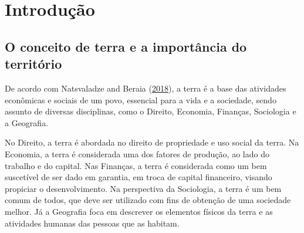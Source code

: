 \documentclass[
	12pt,				%
	oneside,			%
	a4paper,			%
	chapter=TITLE,		%
	section=TITLE,		%
	english,			%
	brazil				%
	]{abntex2}
\begin{document}
{%
	\hypersetup{hidelinks}
	\listoffigures*
	\cleardoublepage
	
	\listofquadros*
	\cleardoublepage
	
	\listoftables*
	\cleardoublepage
	
	\imprimirlistadesiglas
	
	\imprimirlistadesimbolos
	
	\tableofcontents*
	\cleardoublepage
	
}%


\textual

\hypertarget{intro}{%
\chapter{Introdução}\label{intro}}

\hypertarget{o-conceito-de-terra-e-a-importuxe2ncia-do-territuxf3rio}{%
\section{O conceito de terra e a importância do território}\label{o-conceito-de-terra-e-a-importuxe2ncia-do-territuxf3rio}}

De acordo com Natsvaladze and Beraia (\protect\hyperlink{ref-realestate}{2018}), a terra é a base das atividades econômicas e sociais
de um povo, essencial para a vida e a sociedade, sendo assunto de diversas
disciplinas, como o Direito, Economia, Finanças, Sociologia e a Geografia.

No Direito, a terra é abordada no direito de propriedade e uso social da terra.
Na Economia, a terra é considerada uma dos fatores de produção, ao lado do
trabalho e do capital. Nas Finanças, a terra é considerada como um bem
suscetível de ser dado em garantia, em troca de capital financeiro, visando
propiciar o desenvolvimento. Na perspectiva da Sociologia, a terra é um bem
comum de todos, que deve ser utilizado com fins de obtenção de uma sociedade
melhor. Já a Geografia foca em descrever os elementos físicos da terra e as
atividades humanas das pessoas que as habitam.
\end{document}
